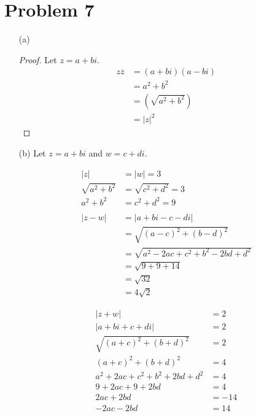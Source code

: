 \documentclass{article}
\begin{document}
\section*{Problem 7}
\begin{itemize}
\item[(a)]
	\begin{proof}	
		Let $z=a+bi$.
		\begin{align*}
			z\overline{z}&=(a+bi)(a-bi) \\
			&=a^2+b^2 \\
			&=\left(\sqrt{a^2+b^2}\right) \\
			&=|z|^2
		\end{align*}
	\end{proof}

\item[(b)]
	Let $z=a+bi$ and $w=c+di$.

	\centering
	\begin{minipage}[t]{0.4\linewidth}
		\begin{align*}
			|z|&=|w|=3 \\
			\sqrt{a^2+b^2}&=\sqrt{c^2+d^2}=3 \\
			a^2+b^2&=c^2+d^2=9 \\
			\\
			|z-w|&=|a+bi-c-di| \\
			&=\sqrt{(a-c)^2+(b-d)^2} \\
			&=\sqrt{a^2-2ac+c^2+b^2-2bd+d^2} \\
			&=\sqrt{9+9+14} \\
			&=\sqrt{32} \\
			&=\boxed{4\sqrt{2}}
		\end{align*}
	\end{minipage}
	\begin{minipage}[t]{0.4\linewidth}
		\begin{align*}
			|z+w|&=2 \\
			|a+bi+c+di|&=2 \\
			\sqrt{(a+c)^2+(b+d)^2}&=2 \\
			(a+c)^2+(b+d)^2&=4 \\
			a^2+2ac+c^2+b^2+2bd+d^2&=4 \\
			9+2ac+9+2bd&=4 \\
			2ac+2bd&=-14 \\
			-2ac-2bd&=14
		\end{align*}
	\end{minipage}

	\justifying

\end{itemize}
\end{document}

